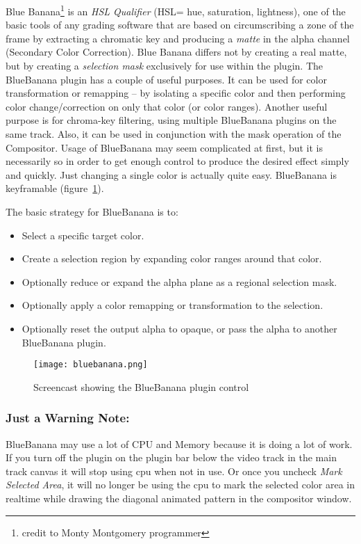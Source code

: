 Blue Banana\protect\footnote{credit to Monty Montgomery programmer} is an \textit{HSL Qualifier} (HSL= hue, saturation, lightness), one of the basic tools of any grading software that are based on circumscribing a zone of the frame by extracting a chromatic key and producing a \textit{matte} in the alpha channel (Secondary Color Correction). Blue Banana differs not by creating a real matte, but by creating a \textit{selection mask} exclusively for use within the plugin. The BlueBanana plugin has a couple of useful purposes. It can be used for color transformation or remapping -- by isolating a specific color and then performing color change/correction on only that color (or color ranges). Another useful purpose is for chroma-key filtering, using multiple BlueBanana plugins on the same track. Also, it can be used in conjunction with the mask operation of the Compositor. Usage of BlueBanana may seem complicated at first, but it is necessarily so in order to get enough control to produce the desired effect simply and quickly. Just changing a single color is actually quite easy. BlueBanana is keyframable (figure~\ref{fig:bluebanana}).

The basic strategy for BlueBanana is to:

\begin{itemize}
    \item Select a specific target color.
    \item Create a selection region by expanding color ranges around that color.
    \item Optionally reduce or expand the alpha plane as a regional selection mask.
    \item Optionally apply a color remapping or transformation to the selection.
    \item Optionally reset the output alpha to opaque, or pass the alpha to another BlueBanana plugin.
\end{itemize}

\begin{figure}[htpb]
    \centering
    \texttt{[image: bluebanana.png]}
    \caption{Screencast showing the BlueBanana plugin control}
    \label{fig:bluebanana}
\end{figure}

\subsubsection*{Just a Warning Note:}
\label{ssub:warning_note}
BlueBanana may use a lot of CPU and Memory because it is doing a lot of work. If you turn off the plugin on the plugin bar below the video track in the main track canvas it will stop using cpu when not in use. Or once you uncheck \textit{Mark Selected Area}, it will no longer be using the cpu to mark the selected color area in realtime while drawing the diagonal animated pattern in the compositor window.

